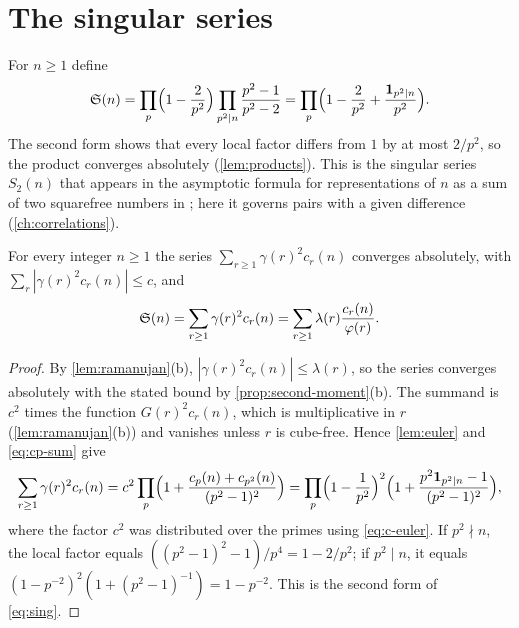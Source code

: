 \section{The singular series}

For $n\ge1$ define
\begin{equation}\label{eq:sing}
\mathfrak S(n)=\prod_p\Bigl(1-\frac2{p^2}\Bigr)\prod_{p^2\mid n}\frac{p^2-1}{p^2-2}
=\prod_p\Bigl(1-\frac2{p^2}+\frac{\mathbf 1_{p^2\mid n}}{p^2}\Bigr).
\end{equation}
The second form shows that every local factor differs from $1$ by at most $2/p^2$, so the product converges absolutely (\cref{lem:products}). This is the singular series $S_2(n)$ that appears in the asymptotic formula for representations of $n$ as a sum of two squarefree numbers in \cite[Corollary~3]{bgpvw1998}; here it governs pairs with a given difference (\cref{ch:correlations}).

\begin{proposition}\label{prop:ramanujan-sing}
For every integer $n\ge1$ the series $\sum_{r\ge1}\gamma(r)^2c_r(n)$ converges absolutely, with $\sum_r|\gamma(r)^2c_r(n)|\le c$, and
\begin{equation}\label{eq:sing-expansion}
\mathfrak S(n)=\sum_{r\ge1}\gamma(r)^2c_r(n)=\sum_{r\ge1}\lambda(r)\frac{c_r(n)}{\varphi(r)}.
\end{equation}
\end{proposition}

\begin{proof}
By \cref{lem:ramanujan}(b), $|\gamma(r)^2c_r(n)|\le\lambda(r)$, so the series converges absolutely with the stated bound by \cref{prop:second-moment}(b). The summand is $c^2$ times the function $G(r)^2c_r(n)$, which is multiplicative in $r$ (\cref{lem:ramanujan}(b)) and vanishes unless $r$ is cube-free. Hence \cref{lem:euler} and \eqref{eq:cp-sum} give
\[
\sum_{r\ge1}\gamma(r)^2c_r(n)=c^2\prod_p\Bigl(1+\frac{c_p(n)+c_{p^2}(n)}{(p^2-1)^2}\Bigr)
=\prod_p\Bigl(1-\frac1{p^2}\Bigr)^2\Bigl(1+\frac{p^2\mathbf 1_{p^2\mid n}-1}{(p^2-1)^2}\Bigr),
\]
where the factor $c^2$ was distributed over the primes using \eqref{eq:c-euler}. If $p^2\nmid n$, the local factor equals $((p^2-1)^2-1)/p^4=1-2/p^2$; if $p^2\mid n$, it equals $(1-p^{-2})^2(1+(p^2-1)^{-1})=1-p^{-2}$. This is the second form of \eqref{eq:sing}.
\end{proof}
